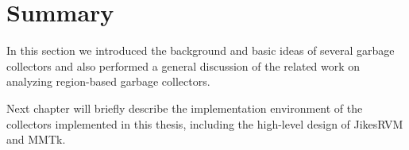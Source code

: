 \section{Summary}

In this section we introduced the background and basic ideas of several garbage collectors and
also performed a general discussion of the related work on analyzing region-based garbage collectors.

Next chapter will briefly describe the implementation environment of the collectors implemented
in this thesis, including the high-level design of JikesRVM and MMTk.
